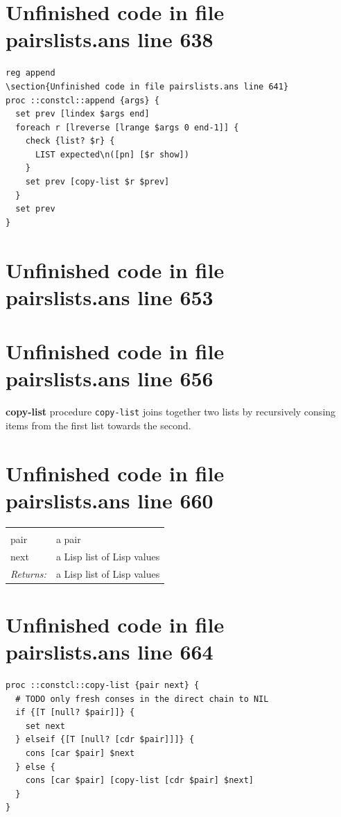 \documentclass[twoside,9pt]{report}
\begin{document}
\section{Unfinished code in file pairslists.ans line 638}
\begin{lstlisting}
reg append
\section{Unfinished code in file pairslists.ans line 641}
proc ::constcl::append {args} {
  set prev [lindex $args end]
  foreach r [lreverse [lrange $args 0 end-1]] {
    check {list? $r} {
      LIST expected\n([pn] [$r show])
    }
    set prev [copy-list $r $prev]
  }
  set prev
}
\end{lstlisting}
\section{Unfinished code in file pairslists.ans line 653}

\section{Unfinished code in file pairslists.ans line 656}

\textbf{copy-list} procedure \texttt{copy-list} joins together two lists by recursively consing items from the first list towards the second.

\section{Unfinished code in file pairslists.ans line 660}
\noindent\begin{tabular}{ |p{1.9cm} p{8cm}| }
\hline
\rowcolor[HTML]{CCCCCC} \multicolumn{2}{|l|}{\bf copy-list (internal)} \\
pair & a pair \\
next & a Lisp list of Lisp values \\
\textit{Returns:} & a Lisp list of Lisp values \\
\hline
\end{tabular}
\section{Unfinished code in file pairslists.ans line 664}
\begin{lstlisting}
proc ::constcl::copy-list {pair next} {
  # TODO only fresh conses in the direct chain to NIL
  if {[T [null? $pair]]} {
    set next
  } elseif {[T [null? [cdr $pair]]]} {
    cons [car $pair] $next
  } else {
    cons [car $pair] [copy-list [cdr $pair] $next]
  }
}
\end{lstlisting}
\end{document}
